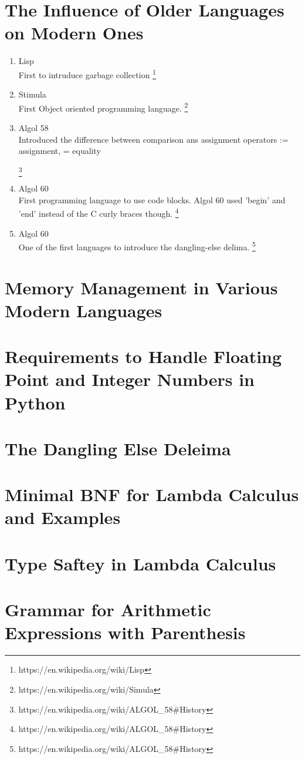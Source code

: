 \documentclass[11pt]{article}
\begin{document}
\newpage
\section{The Influence of Older Languages on Modern Ones}

\begin{enumerate}
\item Lisp\\
    First to intruduce garbage collection
    \footnote{https://en.wikipedia.org/wiki/Lisp}


\item Stimula\\
    First Object oriented programming language.
    \footnote{https://en.wikipedia.org/wiki/Simula}


\item Algol 58\\
    Introduced the difference between comparison ans assignment operators
        := assignment, = equality

    \footnote{https://en.wikipedia.org/wiki/ALGOL_58#History}

\item Algol 60\\
    First programming language to use code blocks.  Algol 60 used 'begin' and
        'end' instead of the C curly braces though.
    \footnote{https://en.wikipedia.org/wiki/ALGOL_58#History}

\item Algol 60\\
    One of the first languages to introduce the dangling-else delima.
    \footnote{https://en.wikipedia.org/wiki/ALGOL_58#History}

\end{enumerate}

\newpage
\section{Memory Management in Various Modern Languages}


\newpage
\section{Requirements to Handle Floating Point and Integer Numbers in Python}

\newpage
\section{The Dangling Else Deleima}

\newpage
\section{Minimal BNF for Lambda Calculus and Examples}

\newpage
\section{Type Saftey in Lambda Calculus}

\newpage
\section{Grammar for Arithmetic Expressions with Parenthesis}
\end{document}
